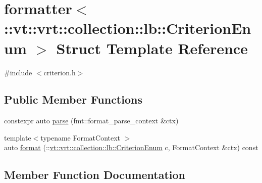 \hypertarget{structformatter_3_1_1vt_1_1vrt_1_1collection_1_1lb_1_1_criterion_enum_01_4}{}\section{formatter$<$\+:\+:vt\+:\+:vrt\+:\+:collection\+:\+:lb\+:\+:Criterion\+Enum $>$ Struct Template Reference}
\label{structformatter_3_1_1vt_1_1vrt_1_1collection_1_1lb_1_1_criterion_enum_01_4}


{\ttfamily \#include $<$criterion.\+h$>$}

\subsection*{Public Member Functions}
\begin{DoxyCompactItemize}
\item 
constexpr auto \hyperlink{structformatter_3_1_1vt_1_1vrt_1_1collection_1_1lb_1_1_criterion_enum_01_4_a694d4616d8acf9d6d36bf094316ca647}{parse} (fmt\+::format\+\_\+parse\+\_\+context \&ctx)
\item 
{\footnotesize template$<$typename Format\+Context $>$ }\\auto \hyperlink{structformatter_3_1_1vt_1_1vrt_1_1collection_1_1lb_1_1_criterion_enum_01_4_aa485f11c69488a5744c0f808dec90041}{format} (\+::\hyperlink{namespacevt_1_1vrt_1_1collection_1_1lb_a4e454750e102cf5404d5ac151148951c}{vt\+::vrt\+::collection\+::lb\+::\+Criterion\+Enum} c, Format\+Context \&ctx) const
\end{DoxyCompactItemize}


\subsection{Member Function Documentation}
\mbox{\label{structformatter_3_1_1vt_1_1vrt_1_1collection_1_1lb_1_1_criterion_enum_01_4_aa485f11c69488a5744c0f808dec90041}} 
